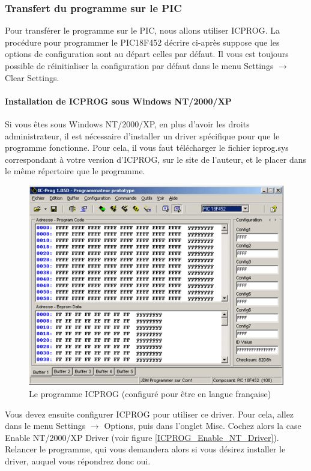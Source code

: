 \documentclass[a4paper]{article}
\begin{document}
\subsubsection{Transfert du programme sur le PIC}

Pour transférer le programme sur le PIC, nous allons utiliser ICPROG. La procédure pour programmer le PIC18F452 décrire ci-après suppose que les options de configuration sont au départ celles par défaut. Il vous est toujours possible de réinitialiser la configuration par défaut dans le menu \og{}Settings\fg{} $\rightarrow$ \og{}Clear Settings\fg{}.

\paragraph{Installation de ICPROG sous Windows NT/2000/XP}

Si vous êtes sous Windows NT/2000/XP, en plus d'avoir les droits administrateur, il est nécessaire d'installer un driver spécifique pour que le programme fonctionne. Pour cela, il vous faut télécharger le fichier icprog.sys correspondant à votre version d'ICPROG, sur le site de l'auteur, et le placer dans le même répertoire que le programme.

\begin{figure}[H]
	\centering
	\includegraphics[scale=0.75]{Images/ICPROG.png}
	\caption{Le programme ICPROG (configuré pour être en langue française)
		\label{ICPROG}}
\end{figure}

Vous devez ensuite configurer ICPROG pour utiliser ce driver. Pour cela, allez dans le menu \og{}Settings\fg{} $\rightarrow$ \og{}Options\fg{}, puis dans l'onglet \og{}Misc\fg{}. Cochez alors la case \og{}Enable NT/2000/XP Driver\fg{} (voir figure \ref{ICPROG_Enable_NT_Driver}). Relancer le programme, qui vous demandera alors si vous désirez installer le driver, auquel vous répondrez donc oui.
\end{document}

